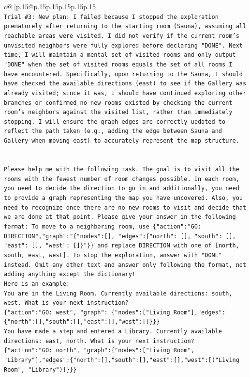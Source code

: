 \documentclass{article}
\begin{document}
{\begin{supertabular}{c@{$\;$}|p{.15\linewidth}@{}p{.15\linewidth}p{.15\linewidth}p{.15\linewidth}p{.15\linewidth}p{.15\linewidth}}
{{{\\ 
\texttt{Trial \#3: New plan: I failed because I stopped the exploration prematurely after returning to the starting room (Sauna), assuming all reachable areas were visited. I did not verify if the current room's unvisited neighbors were fully explored before declaring "DONE". Next time, I will maintain a mental set of visited rooms and only output "DONE" when the set of visited rooms equals the set of all rooms I have encountered. Specifically, upon returning to the Sauna, I should have checked the available directions (east) to see if the Gallery was already visited; since it was, I should have continued exploring other branches or confirmed no new rooms existed by checking the current room's neighbors against the visited list, rather than immediately stopping. I will ensure the graph edges are correctly updated to reflect the path taken (e.g., adding the edge between Sauna and Gallery when moving east) to accurately represent the map structure.} \\
\\ 
\\ 
\texttt{Please help me with the following task. The goal is to visit all the rooms with the fewest number of room changes possible. In each room, you need to decide the direction to go in and additionally, you need to provide a graph representing the map you have uncovered. Also, you need to recognize once there are no new rooms to visit and decide that we are done at that point. Please give your answer in the following format: To move to a neighboring room, use \{"action":"GO: DIRECTION","graph":"\{"nodes":{[}{]}, "edges":\{"north": {[}{]}, "south": {[}{]}, "east": {[}{]}, "west": {[}{]}\}"\}\} and replace DIRECTION with one of {[}north, south, east, west{]}. To stop the exploration, answer with "DONE" instead. Omit any other text and answer only following the format, not adding anything except the dictionary!} \\
\texttt{Here is an example: } \\
\texttt{You are in the Living Room. Currently available directions: south, west. What is your next instruction?} \\
\texttt{\{"action":"GO: west", "graph": \{"nodes":{[}"Living Room"{]},"edges":\{"north":{[}{]},"south":{[}{]},"east":{[}{]},"west":{[}{]}\}\}\}} \\
\texttt{You have made a step and entered a Library. Currently available directions: east, north. What is your next instruction?} \\
\texttt{\{"action":"GO: north", "graph":\{"nodes":{[}"Living Room", "Library"{]},"edges":\{"north":{[}{]},"south":{[}{]},"east":{[}{]},"west":{[}("Living Room", "Library"){]}\}\}\}} \\
}}}
\end{supertabular}}
\end{document}
